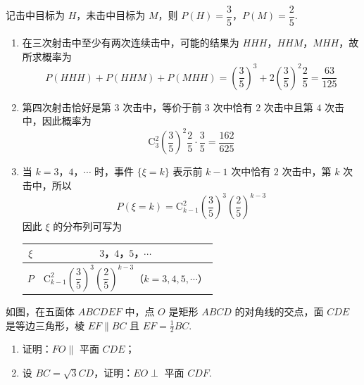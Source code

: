 \begin{solution}
记击中目标为 \(H\)，未击中目标为 \(M\)，则 \(P(H)=\dfrac35\)，\(P(M)=\dfrac25\).
\begin{enumerate}
\item 在三次射击中至少有两次连续击中，可能的结果为 \(HHH\)，\(HHM\)，\(MHH\)，故所求概率为
\[
P(HHH)+P(HHM)+P(MHH)=\left(\frac35\right)^{3}+2\left(\frac35\right)^{2}\frac25=\frac{63}{125}
\]
\item 第四次射击恰好是第 \(3\) 次击中，等价于前 \(3\) 次中恰有 \(2\) 次击中且第 \(4\) 次击中，因此概率为
\[
\mathrm C_{3}^{2}\left(\frac35\right)^{2}\frac25\cdot\frac35=\frac{162}{625}
\]
\item 当 \(k=3\)，\(4\)，\(\cdots\) 时，事件 \(\{\xi=k\}\) 表示前 \(k-1\) 次中恰有 \(2\) 次击中，第 \(k\) 次击中，所以
\[
P(\xi=k)=\mathrm C_{k-1}^{2}\left(\frac35\right)^{3}\left(\frac25\right)^{k-3}
\]
因此 \(\xi\) 的分布列可写为
\begin{center}
\begin{tabular}{c|c}
\hline
\(\xi\) & \(3\)，\(4\)，\(5\)，\(\cdots\) \\
\hline
\(P\) & \(\mathrm C_{k-1}^{2}\left(\dfrac35\right)^{3}\left(\dfrac25\right)^{k-3}\)（\(k=3,4,5,\cdots\)） \\
\hline
\end{tabular}
\end{center}
\end{enumerate}
\end{solution}

\begin{problem}
如图，在五面体 \(ABCDEF\) 中，点 \(O\) 是矩形 \(ABCD\) 的对角线的交点，面 \(CDE\) 是等边三角形，棱 \(EF\parallel BC\) 且 \(EF=\frac{1}{2}BC\).

\begin{enumerate}
\item 证明：\(FO\parallel\) 平面 \(CDE\)；
\item 设 \(BC=\sqrt{3}CD\)，证明：\(EO\perp\) 平面 \(CDF\).
\end{enumerate}

\end{problem}

